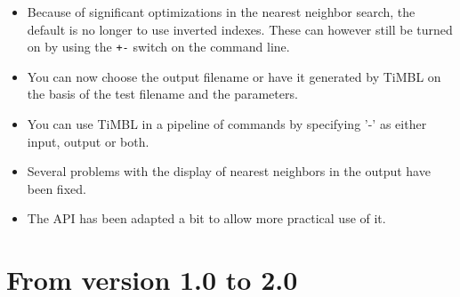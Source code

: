 \documentclass{book}
\begin{document}
\begin{itemize}
\begin{itemize}
\item All of the output needed for analysing the matching of nearest
neighbors has been moved to the verbosity setting.

\item Verbosity levels and some other options can be switched on {\tt
+v} and off {\tt -v}, even between different classification actions.

\item Because of the large amount of verbosity levels, the {\tt +v}
option takes mnemonic abbreviations as arguments instead of numeric
verbosity levels. Although the old (numeric) format is still
supported, it's use is not encouraged as it will disappear in future
versions.

\end{itemize}

\item Because of significant optimizations in the nearest neighbor
search, the default is no longer to use inverted indexes. These can
however still be turned on by using the {\tt +-} switch on the command
line.

\item You can now choose the output filename or have it generated by
TiMBL on the basis of the test filename and the parameters.

\item You can use TiMBL in a pipeline of commands by specifying '-' as
either input, output or both.

\item Several problems with the display of nearest neighbors in the
output have been fixed.

\item The API has been adapted a bit to allow more practical use of
it.

\end{itemize}

\section{From version 1.0 to 2.0}
\end{document}
